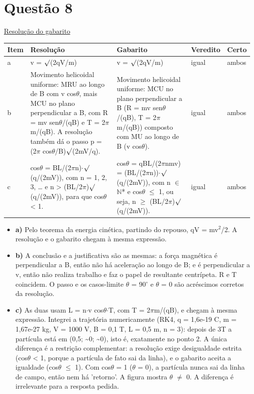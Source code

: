 \documentclass{article}%
\begin{document}
\section*{Questão 8}%
\href{https://poliedroresolve.sistemapoliedro.com.br/vestibulares/ita/2027/ita-2-fase-dia-3-22-10-2026-2-fase-dia-3/dissertativa-8-fisica-2-fase-dia-3-ita-2027}{Resolução do gabarito}\par\smallskip%
\begin{longtable}{@{}p{} p{} p{} p{} p{}@{}}\toprule Item & Resolução & Gabarito & Veredito & Certo \\ \midrule
a & v = $\surd$(2qV/m) & v = $\surd$(2qV/m) & igual & ambos \\
b & Movimento helicoidal uniforme: MRU ao longo de B com v cos$\theta$, mais MCU no plano perpendicular a B, com R = mv sen$\theta$/(qB) e T = 2$\pi$m/(qB). A resolução também dá o passo p = (2$\pi$ cos$\theta$/B)$\surd$(2mV/q). & Movimento helicoidal uniforme: MCU no plano perpendicular a B (R = mv sen$\theta$/(qB), T = 2$\pi$m/(qB)) composto com MU ao longo de B (v cos$\theta$). & igual & ambos \\
c & cos$\theta$ = BL/(2$\pi$n)$\cdot$$\surd$(q/(2mV)), com n = 1, 2, 3, \ldots{} e n > (BL/2$\pi$)$\surd$(q/(2mV)), para que cos$\theta$ < 1. & cos$\theta$ = qBL/(2$\pi$nmv) = (BL/(2$\pi$n))$\cdot$$\surd$(q/(2mV)), com n $\in$ $\mathbb{N}$* e cos$\theta$ $\leq$ 1, ou seja, n $\geq$ (BL/2$\pi$)$\surd$(q/(2mV)). & igual & ambos \\
\bottomrule\end{longtable}%
\begin{itemize}%
\item%
\textbf{a)} Pelo teorema da energia cinética, partindo do repouso, qV = mv$^2$/2. A resolução e o gabarito chegam à mesma expressão.%
\item%
\textbf{b)} A conclusão e a justificativa são as mesmas: a força magnética é perpendicular a B, então não há aceleração ao longo de B; e é perpendicular a v, então não realiza trabalho e faz o papel de resultante centrípeta. R e T coincidem. O passo e os casos{-}limite $\theta$ = 90$^\circ$ e $\theta$ = 0 são acréscimos corretos da resolução.%
\item%
\textbf{c)} As duas usam L = n$\cdot$v cos$\theta$$\cdot$T, com T = 2$\pi$m/(qB), e chegam à mesma expressão. Integrei a trajetória numericamente (RK4, q = 1,6e{-}19 C, m = 1,67e{-}27 kg, V = 1000 V, B = 0,1 T, L = 0,5 m, n = 3): depois de 3T a partícula está em (0,5; \textasciitilde{}0; \textasciitilde{}0), isto é, exatamente no ponto 2. A única diferença é a restrição complementar: a resolução exige desigualdade estrita (cos$\theta$ < 1, porque a partícula de fato sai da linha), e o gabarito aceita a igualdade (cos$\theta$ $\leq$ 1). Com cos$\theta$ = 1 ($\theta$ = 0), a partícula nunca sai da linha de campo, então nem há 'retorno'. A figura mostra $\theta$ $\neq$ 0. A diferença é irrelevante para a resposta pedida.%
\end{itemize}%
\end{document}
